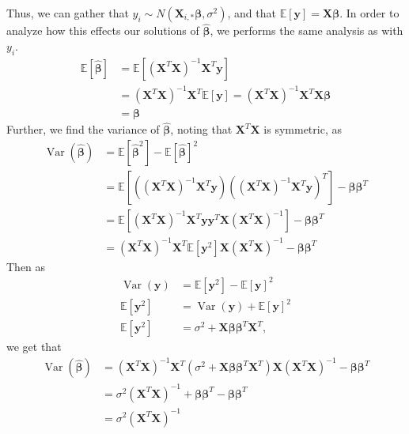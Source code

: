 \documentclass{article}
\DeclareMathOperator*{\Var}{Var}
\begin{document}
Thus, we can gather that $y_i \sim N\left( \textbf{X}_{i,*} \boldsymbol{\beta}, \sigma^2 \right)$, and that $\mathbb{E}[\boldsymbol{y}] = \textbf{X} \boldsymbol{\beta}$. In order to analyze how this effects our solutions of $\boldsymbol{\hat{\beta}}$, we performs the same analysis as with $y_i$.
\begin{align*}
    \mathbb{E}\left[ \boldsymbol{\hat{\beta}} \right] &= \mathbb{E}\left[ \left( \textbf{X}^T \textbf{X} \right)^{-1} \textbf{X}^T \boldsymbol{y} \right] \\
    &= \left( \textbf{X}^T \textbf{X} \right)^{-1} \textbf{X}^T \mathbb{E}[\boldsymbol{y}]
    = \left( \textbf{X}^T \textbf{X} \right)^{-1} \textbf{X}^T \textbf{X}\boldsymbol{\beta} \\
    &= \boldsymbol{\beta}
\end{align*}
Further, we find the variance of $\boldsymbol{\hat{\beta}}$, noting that $\textbf{X}^T\textbf{X}$ is symmetric, as
\begin{align*}
    \Var(\boldsymbol{\hat{\beta}}) &= \mathbb{E}[\boldsymbol{\hat{\beta}}^2] - \mathbb{E}[\boldsymbol{\hat{\beta}}]^2 \\
    &= \mathbb{E}\left[ \left( (\textbf{X}^T \textbf{X})^{-1} \textbf{X}^T \boldsymbol{y} \right) \left( (\textbf{X}^T \textbf{X})^{-1} \textbf{X}^T \boldsymbol{y} \right)^T \right] - \boldsymbol{\beta} \boldsymbol{\beta}^T \\
    &= \mathbb{E}\left[ (\textbf{X}^T \textbf{X})^{-1} \textbf{X}^T \boldsymbol{y} \boldsymbol{y}^T \textbf{X} (\textbf{X}^T \textbf{X})^{-1} \right] - \boldsymbol{\beta} \boldsymbol{\beta}^T \\
    &= (\textbf{X}^T \textbf{X})^{-1} \textbf{X}^T \mathbb{E}\left[ \boldsymbol{y}^2 \right] \textbf{X} (\textbf{X}^T \textbf{X})^{-1} - \boldsymbol{\beta} \boldsymbol{\beta}^T
\end{align*}
Then as
\begin{align*}
    \Var(\boldsymbol{y}) &= \mathbb{E}\left[ \boldsymbol{y}^2 \right] - \mathbb{E}\left[ \boldsymbol{y} \right]^2 \\
    \mathbb{E}\left[ \boldsymbol{y}^2 \right] &= \Var(\boldsymbol{y}) + \mathbb{E}\left[ \boldsymbol{y} \right]^2 \\
    \mathbb{E}\left[ \boldsymbol{y}^2 \right] &= \sigma^2 + \textbf{X}\boldsymbol{\beta} \boldsymbol{\beta}^T \textbf{X}^T,
\end{align*}
we get that
\begin{align*}
    \Var(\boldsymbol{\hat{\beta}}) &= (\textbf{X}^T \textbf{X})^{-1} \textbf{X}^T \left( \sigma^2 + \textbf{X}\boldsymbol{\beta} \boldsymbol{\beta}^T \textbf{X}^T \right) \textbf{X} (\textbf{X}^T \textbf{X})^{-1} - \boldsymbol{\beta} \boldsymbol{\beta}^T \\
    &= \sigma^2 (\textbf{X}^T \textbf{X})^{-1} + \boldsymbol{\beta} \boldsymbol{\beta}^T - \boldsymbol{\beta} \boldsymbol{\beta}^T \\
    &= \sigma^2 (\textbf{X}^T \textbf{X})^{-1}
\end{align*}
\end{document}
